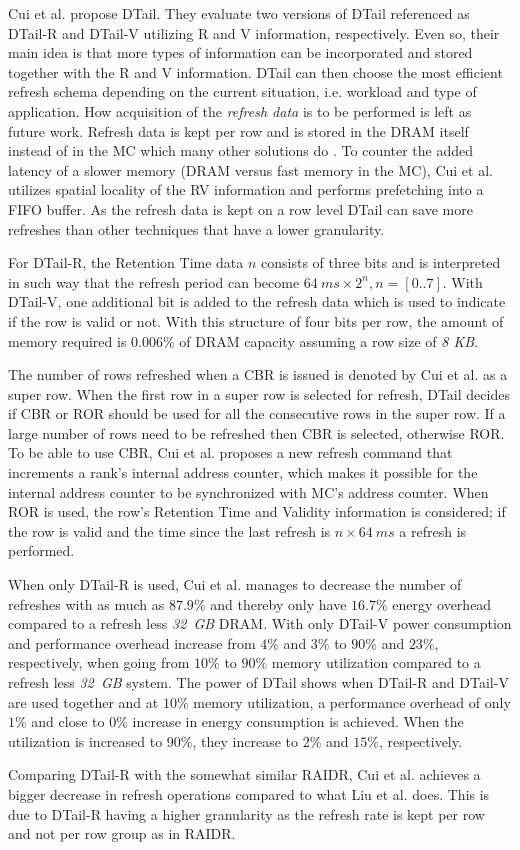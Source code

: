 Cui et al. \cite{dtail} propose DTail. They evaluate two versions of DTail referenced as DTail-R and DTail-V utilizing R and V information, respectively. Even so, their main idea is that more types of  information can be incorporated and stored together with the R and V information. DTail can then choose the most efficient refresh schema depending on the current situation, i.e. workload and type of application. How acquisition of the \textit{refresh data} is to be performed is left as future work. Refresh data is kept per row and is stored in the DRAM itself instead of in the MC which many other solutions do \cite{raidr}\cite{smartrefresh}\cite{refrint}. To counter the added latency of a slower memory (DRAM versus fast memory in the MC), Cui et al. utilizes spatial locality of the RV information and performs prefetching into a FIFO buffer. As the refresh data is kept on a row level DTail can save more refreshes than other techniques that have a lower granularity.

For DTail-R, the Retention Time data $n$ consists of three bits and is interpreted in such way that the refresh period can become \(64\:ms \times 2^n, n = [0..7]\). With DTail-V, one additional bit is added to the refresh data which is used to indicate if the row is valid or not. With this structure of four bits per row, the amount of memory required is $0.006\%$ of DRAM capacity assuming a row size of \textit{8 KB}.

The number of rows refreshed when a CBR is issued is denoted by Cui et al. as a super row. When the first row in a super row is selected for refresh, DTail decides if CBR or ROR should be used for all the consecutive rows in the super row. If a large number of rows need to be refreshed then CBR is selected, otherwise ROR. To be able to use CBR, Cui et al. proposes a new refresh command that increments a rank's internal address counter, which makes it possible for the internal address counter to be synchronized with MC's address counter. When ROR is used, the row's Retention Time and Validity information is considered; if the row is valid and the time since the last refresh is $n \times 64\:ms$ a refresh is performed. 

When only DTail-R is used, Cui et al. manages to decrease the number of refreshes with as much as $87.9\%$ and thereby only have $16.7\%$ energy overhead compared to a refresh less \textit{32~GB} DRAM. With only DTail-V power consumption and performance overhead increase from $4\%$ and $3\%$ to $90\%$ and $23\%$, respectively, when going from $10\%$ to $90\%$ memory utilization compared to a refresh less \textit{32~GB} system. The power of DTail shows when DTail-R and DTail-V are used together and at $10\%$ memory utilization, a performance overhead of only $1\%$ and close to $0\%$ increase in energy consumption is achieved. When the utilization is increased to $90\%$, they increase to $2\%$ and $15\%$, respectively.

Comparing DTail-R with the somewhat similar RAIDR, Cui et al. achieves a bigger decrease in refresh operations compared to what Liu et al. does. This is due to DTail-R having a higher granularity as the refresh rate is kept per row and not per row group as in RAIDR.